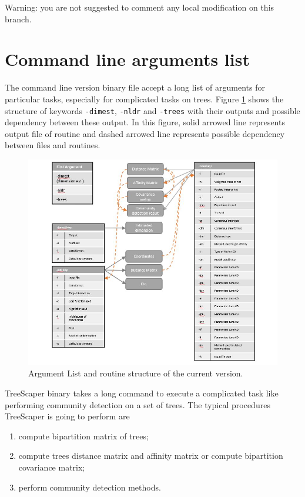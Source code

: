 \documentclass[11pt,a4paper]{article}
\theoremstyle{definition}
\theoremstyle{definition}
\numberwithin{equation}{section}
\begin{document}
	Warning: you are not suggested to comment any local modification on this 
	branch. 
	

	
	\section{Command line arguments list}
	
	The command line version binary file accept a long list of arguments for particular tasks, especially for complicated tasks on trees. Figure \ref{fig:argumentcurrent} shows the structure of keywords \texttt{-dimest}, \texttt{-nldr} and \texttt{-trees} with their outputs and possible dependency between these output. In this figure, solid arrowed line represents output file of routine and dashed arrowed line represents possible dependency between files and routines.
	
	\begin{figure}[!h]
		\includegraphics[width=\textwidth]{ArgumentList1.jpg}
		\caption{Argument List and routine structure of the current version.}
		\label{fig:argumentcurrent}
	\end{figure}
	
	TreeScaper binary takes a long command to execute a complicated task like performing community detection on a set of trees. The typical procedures TreeScaper is going to perform are
	\begin{enumerate}
		\item compute bipartition matrix of trees;
		\item compute trees distance matrix and affinity matrix or compute bipartition covariance matrix;
		\item perform community detection methods.
	\end{enumerate}
	
\end{document}
